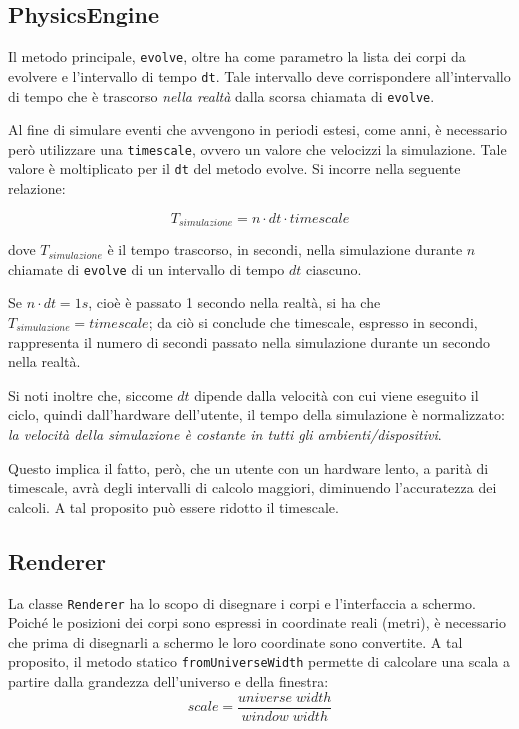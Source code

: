 \documentclass{article}
\begin{document}
\subsection{PhysicsEngine}
\label{physics_engine}
Il metodo principale, \verb|evolve|, oltre ha come parametro la lista dei corpi da evolvere e l'intervallo di tempo \verb|dt|. Tale intervallo deve corrispondere all'intervallo di tempo che è trascorso \textit{nella realtà} dalla scorsa chiamata di \verb|evolve|.

Al fine di simulare eventi che avvengono in periodi estesi, come anni, è necessario però utilizzare una \verb|timescale|, ovvero un valore che velocizzi la simulazione. Tale valore è moltiplicato per il \verb|dt| del metodo evolve. Si incorre nella seguente relazione:

\begin{equation*}
    T_{simulazione} = n \cdot dt \cdot timescale
\end{equation*}

dove $T_{simulazione}$ è il tempo trascorso, in secondi, nella simulazione durante $n$ chiamate di \verb|evolve| di un intervallo di tempo $dt$ ciascuno.

 Se $n \cdot dt = 1 s$, cioè è passato 1 secondo nella realtà, si ha che $T_{simulazione} = timescale$; da ciò si conclude che timescale, espresso in secondi, rappresenta il numero di secondi passato nella simulazione durante un secondo nella realtà.

Si noti inoltre che, siccome $dt$ dipende dalla velocità con cui viene eseguito il ciclo, quindi dall'hardware dell'utente, il tempo della simulazione è normalizzato: \textit{la velocità della simulazione è costante in tutti gli ambienti/dispositivi}.

Questo implica il fatto, però, che un utente con un hardware lento, a parità di timescale, avrà degli intervalli di calcolo maggiori, diminuendo l'accuratezza dei calcoli. A tal proposito può essere ridotto il timescale.

\subsection{Renderer}
La classe \verb|Renderer| ha lo scopo di disegnare i corpi e l'interfaccia a schermo. Poiché le posizioni dei corpi sono espressi in coordinate reali (metri), è necessario che prima di disegnarli a schermo le loro coordinate sono convertite. A tal proposito, il metodo statico \verb|fromUniverseWidth| permette di calcolare una scala a partire dalla grandezza dell'universo e della finestra:
\begin{equation*}
    scale = \frac{universe\;width}{window\;width}
\end{equation*}
\end{document}
